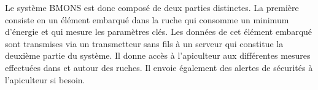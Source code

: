 Le système BMONS est donc composé de deux parties distinctes. La première consiste en un élément embarqué dans la ruche qui consomme un minimum d'énergie et qui mesure les paramètres clés. Les données de cet élément embarqué sont transmises via un transmetteur sans fils à un serveur qui constitue la deuxième partie du système. Il donne accès à l'apiculteur aux différentes mesures effectuées dans et autour des ruches. Il envoie également des alertes de sécurités à l'apiculteur si besoin. 

